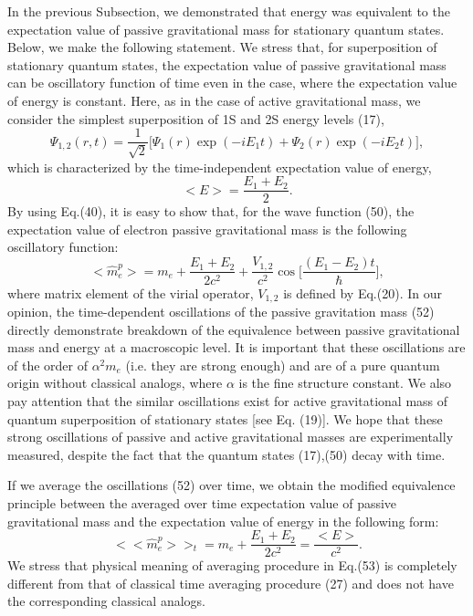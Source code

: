 \documentclass{ws-ijmpd}
\begin{document}
In the previous Subsection, we demonstrated that energy was
equivalent to the expectation value of passive gravitational mass
for stationary quantum states. Below, we make the following
statement. We stress that, for superposition of stationary quantum
states, the expectation value of passive gravitational mass can be
oscillatory function of time even in the case, where the
expectation value of energy is constant. Here, as in the case of
active gravitational mass, we consider the simplest superposition
of 1S and 2S energy levels (17),
\begin{equation}
\Psi_{1,2}(r,t) = \frac{1}{\sqrt{2}} \bigl[ \Psi_1(r) \exp(-iE_1t)
+ \Psi_2(r) \exp(-iE_2t) \bigl],
\end{equation}
which is characterized by the time-independent expectation value of
energy,
\begin{equation}
<E> = \frac{E_1+E_2}{2} .
\end{equation}
By using Eq.(40), it is easy to show that, for the wave function 
(50), the expectation value of electron
 passive gravitational mass is the following oscillatory function:
\begin{equation}
<\hat m^p_e> = m_e + \frac{E_1+E_2}{2 c^2} + \frac{V_{1,2}}{c^2}
\cos \biggl[ \frac{(E_1-E_2)t}{\hbar} \biggl] ,
\end{equation}
where matrix element of the virial operator, $V_{1,2}$ is defined
by Eq.(20). In our opinion, the time-dependent oscillations of the
passive gravitation mass (52) directly demonstrate breakdown of
the equivalence between passive gravitational mass and energy at a
macroscopic level. It is important that these oscillations are of
the order of $\alpha^2 m_e$ (i.e. they are strong enough) and are
of a pure quantum origin without classical analogs, where $\alpha$
is the fine structure constant. We also pay attention that the
similar oscillations exist for active gravitational mass of
quantum superposition of stationary states [see Eq. (19)]. We hope
that these strong oscillations of passive and active gravitational
masses are experimentally measured, despite the fact that the
quantum states (17),(50) decay with time.

If we average the oscillations (52) over time, we obtain the
modified equivalence principle between the averaged over time
expectation value of passive gravitational mass and the
expectation value of energy in the following form:
\begin{equation}
<< \hat m^p_e >>_t = m_e + \frac{E_1+E_2}{2c^2} = \frac{<E>}{c^2}.
\end{equation}
We stress that physical meaning of averaging procedure in Eq.(53)
is completely different from that of classical time averaging
procedure (27) and does not have the corresponding classical
analogs.
\end{document}
